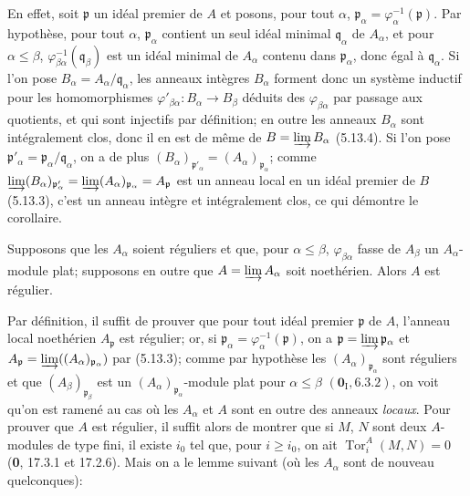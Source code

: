 En effet, soit $\mathfrak p$ un idéal premier de $A$ et posons, pour tout
$\alpha$, $\mathfrak p_\alpha=\varphi_\alpha^{-1}(\mathfrak p)$. Par
hypothèse, pour tout $\alpha$, $\mathfrak p_\alpha$ contient un seul idéal
minimal $\mathfrak q_\alpha$ de $A_\alpha$, et pour $\alpha\leq\beta$,
$\varphi_{\beta\alpha}^{-1}(\mathfrak q_\beta)$ est un idéal minimal de
$A_\alpha$ contenu dans $\mathfrak p_\alpha$, donc égal à
$\mathfrak q_\alpha$. Si l'on pose
$B_\alpha=A_\alpha/\mathfrak q_\alpha$, les anneaux intègres $B_\alpha$
forment donc un système inductif pour les homomorphismes
$\varphi'_{\beta\alpha}:B_\alpha\to B_\beta$ déduits des
$\varphi_{\beta\alpha}$ par passage aux quotients, et qui sont injectifs par
définition; en outre les anneaux $B_\alpha$ sont intégralement clos, donc il en
est de même de $B=\varinjlim B_\alpha$ (5.13.4). Si l'on pose
$\mathfrak p'_\alpha=\mathfrak p_\alpha/\mathfrak q_\alpha$, on a de plus
$(B_\alpha)_{\mathfrak p'_\alpha}=(A_\alpha)_{\mathfrak p_\alpha}$; comme
$\varinjlim(B_\alpha)_{\mathfrak p'_\alpha}
=\varinjlim(A_\alpha)_{\mathfrak p_\alpha}=A_{\mathfrak p}$
est un anneau local en un idéal premier de $B$ (5.13.3), c'est un anneau
intègre et intégralement clos, ce qui démontre le corollaire.

\begin{proposition}[5.13.7]
\label{IV.2.s5.13.7-fr}
Supposons que les $A_\alpha$ soient réguliers et que, pour
$\alpha\leq\beta$, $\varphi_{\beta\alpha}$ fasse de $A_\beta$ un
$A_\alpha$-module plat; supposons en outre que
$A=\varinjlim A_\alpha$ soit noethérien. Alors $A$ est régulier.
\end{proposition}

Par définition, il suffit de prouver que pour tout idéal premier $\mathfrak p$
de $A$, l'anneau local noethérien $A_{\mathfrak p}$ est régulier; or, si
$\mathfrak p_\alpha=\varphi_\alpha^{-1}(\mathfrak p)$, on a
$\mathfrak p=\varinjlim\mathfrak p_\alpha$ et
$A_{\mathfrak p}=\varinjlim((A_\alpha)_{\mathfrak p_\alpha})$ par (5.13.3);
comme par hypothèse les $(A_\alpha)_{\mathfrak p_\alpha}$ sont réguliers et
que $(A_\beta)_{\mathfrak p_\beta}$ est un
$(A_\alpha)_{\mathfrak p_\alpha}$-module plat pour $\alpha\leq\beta$
$(\mathbf{0}_{\mathrm I}, 6.3.2)$, on voit qu'on est ramené au cas où les $A_\alpha$ et
$A$ sont en outre des anneaux \emph{locaux}. Pour prouver que $A$ est régulier, il
suffit alors de montrer que si $M$, $N$ sont deux $A$-modules de type fini, il
existe $i_0$ tel que, pour $i\geq i_0$,
on ait $\operatorname{Tor}^A_i(M,N)=0$ (\textbf{0}, 17.3.1 et 17.2.6). Mais on a le
lemme suivant (où les $A_\alpha$ sont de nouveau quelconques):

